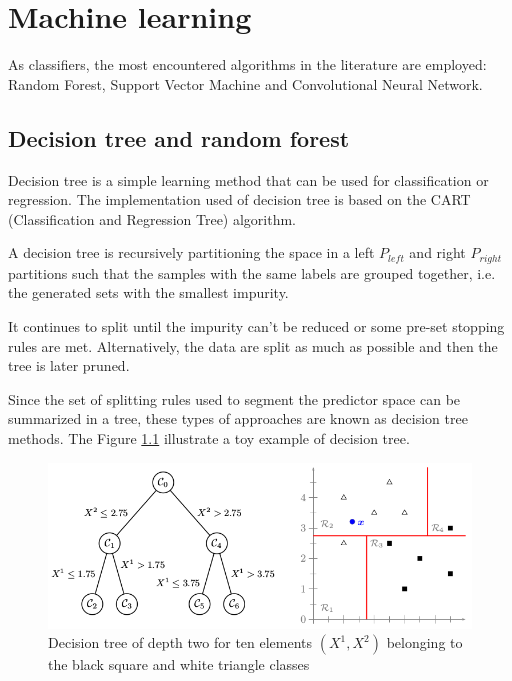 \chapter{Machine learning}  \label{sec:classifier}

As classifiers, the most encountered algorithms in the literature are employed: Random Forest, Support Vector Machine and Convolutional Neural Network.

\section{Decision tree and random forest}

Decision tree is a simple learning method that can be used for classification or regression. The implementation used of decision tree is based on the CART (Classification and Regression Tree) algorithm.

A decision tree is recursively partitioning the space in a left $P_{left}$ and right $P_{right}$ partitions such that the samples with the same labels are grouped together, i.e. the generated sets with the smallest impurity.

It continues to split until the impurity can't be reduced or some pre-set stopping rules are met. Alternatively, the data are split as much as possible and then the tree is later pruned.

Since the set of splitting rules used to segment the predictor space can be summarized in a tree, these types of approaches are known as decision tree methods. The Figure   \ref{fig:decision_tree_simple_example} illustrate a toy example of decision tree.

\begin{figure}[h]
    \includegraphics[scale=0.5]{img/decision_tree_simple_example}
    \caption[Decision tree of for ten elements belonging to two classes]{Decision tree of depth two for ten elements $(X^1, X^2)$ belonging to the black square and white triangle classes}
    \label{fig:decision_tree_simple_example}
\end{figure}

